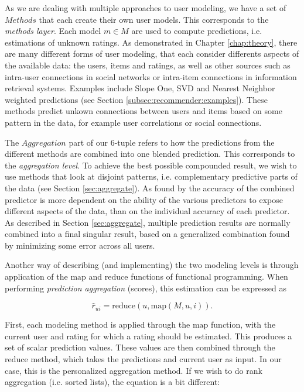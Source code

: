 As we are dealing with multiple approaches to user modeling, we have a set of $Methods$ that each create their own
user models. 
This corresponds to the \emph{methods layer}.
Each model $m \in M$ are used to compute predictions, i.e. estimations of unknown ratings.
As demonstrated in Chapter \ref{chap:theory}, there are many different forms of user modeling,
that each consider differents aspects of the available data: the users, items and ratings, as well as 
other sources such as intra-user connections in social networks or intra-item connections in information retrieval systems.
Examples include Slope One, SVD and Nearest Neighbor weighted predictions
(see Section \ref{subsec:recommender:examples}).
These methods predict unkown connections between users and items based on some pattern in the data,
for example user correlations or social connections.

The $Aggregation$ part of our 6-tuple refers to how the predictions from the different methods are combined
into one blended prediction. 
This corresponds to the \emph{aggregation level}.
To achieve the best possible compounded result, we wish to use methods that look at disjoint patterns, 
i.e. complementary predictive parts of the data (see Section \ref{sec:aggregate}).
As found by \citet[p6]{Bell2007} the accuracy of the combined predictor is more dependent on the 
ability of the various predictors to expose different aspects of the data, than on 
the individual accuracy of each predictor.
As described in Section \ref{sec:aggregate}, multiple prediction results are normally 
combined into a final singular result,
based on a generalized combination found by minimizing some error across all users.

Another way of describing (and implementing) the two modeling levels is through application
of the $\mathrm{map}$ and $\mathrm{reduce}$ functions of functional programming.
When performing \emph{prediction aggregation} (scores), this estimation can be expressed as

\begin{equation*}
  \hat{r}_{ui} = \mathrm{reduce}(u, \mathrm{map}(M,u,i)).
\end{equation*}

First, each modeling method is applied through the $\mathrm{map}$ function, with the current user and rating for which
a rating should be estimated. This produces a set of scalar prediction values. These values are then
combined through the $\mathrm{reduce}$ method, which takes the predictions and current user as input.
In our case, this is the personalized aggregation method. 
If we wish to do rank aggregation (i.e. sorted lists), the equation is a bit different:

